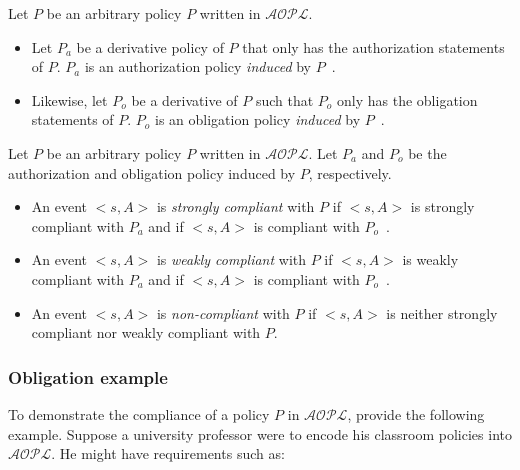 
\begin{definition}
    Let $P$ be an arbitrary policy $P$ written in $\mathcal{AOPL}$.

    \begin{itemize}
        \item Let $P_a$ be a derivative policy of $P$ that only has the authorization statements of $P$.
            $P_a$ is an authorization policy \textit{induced} by $P$~\citep{gelfond_authorization_2008}.
        \item Likewise, let $P_o$ be a derivative of $P$ such that $P_o$ only has the obligation statements of $P$.
            $P_o$ is an obligation policy \textit{induced} by $P$~\citep{gelfond_authorization_2008}.
    \end{itemize}
\end{definition}

\begin{definition}
    Let $P$ be an arbitrary policy $P$ written in $\mathcal{AOPL}$.
    Let $P_a$ and $P_o$ be the authorization and obligation policy induced by $P$, respectively.

    \begin{itemize}
        \item An event $<s, A>$ is \textit{strongly compliant} with $P$ if $<s, A>$ is strongly compliant with $P_a$ and if $<s, A>$ is compliant with $P_o$~\citep{gelfond_authorization_2008}.
        \item An event $<s, A>$ is \textit{weakly compliant} with $P$ if $<s, A>$ is weakly compliant with $P_a$ and if $<s, A>$ is compliant with $P_o$~\citep{gelfond_authorization_2008}.
        \item An event $<s, A>$ is \textit{non-compliant} with $P$ if $<s, A>$ is neither strongly compliant nor weakly compliant with $P$\footnotemark.
    \end{itemize}
\end{definition}


\subsubsection{Obligation example}

To demonstrate the compliance of a policy $P$ in $\mathcal{AOPL}$, \citet{gelfond_authorization_2008} provide the following example.
Suppose a university professor were to encode his classroom policies into $\mathcal{AOPL}$.
He might have requirements such as:

